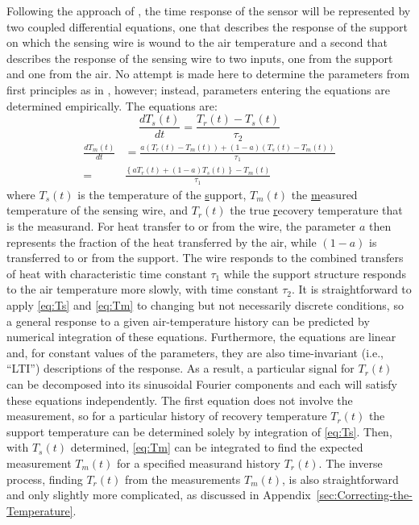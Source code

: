 \documentclass[11pt,twoside,american,12pt,twoside,american]{article}\usepackage[]{graphicx}\usepackage[]{color}
\begin{document}
Following the approach of \citet{PayneEtAl1994}, the time response
of the sensor will be represented by two coupled differential equations,
one that describes the response of the support on which the sensing
wire is wound to the air temperature and a second that describes the
response of the sensing wire to two inputs, one from the support and
one from the air. No attempt is made here to determine the parameters
from first principles as in \citet{PayneEtAl1994}, however; instead,
parameters entering the equations are determined empirically. The
equations are:\\
\begin{equation}
\frac{dT_{s}(t)}{dt}=\frac{T_{r}(t)-T_{s}(t)}{\tau_{2}}\label{eq:Ts}
\end{equation}
\begin{align}
\frac{dT_{m}(t)}{dt} & =\frac{a(T_{r}(t)-T_{m}(t))+(1-a)(T_{s}(t)-T_{m}(t))}{\tau_{1}}\label{eq:Tm}\\
= & \frac{\left\{ aT_{r}(t)+(1-a)T_{s}(t)\right\} -T_{m}(t)}{\tau_{1}}\nonumber 
\end{align}
where $T_{s}(t)$ is the temperature of the \uline{s}upport, $T_{m}(t)$
the \uline{m}easured temperature of the sensing wire, and $T_{r}(t)$
the true \uline{r}ecovery temperature that is the measurand. For
heat transfer to or from the wire, the parameter $a$ then represents
the fraction of the heat transferred by the air, while $(1-a)$ is
transferred to or from the support. The wire responds to the combined
transfers of heat with characteristic time constant $\tau_{1}$ while
the support structure responds to the air temperature more slowly,
with time constant $\tau_{2}$. It is straightforward to apply \eqref{eq:Ts}
and \eqref{eq:Tm} to changing but not necessarily discrete conditions,
so a general response to a given air-temperature history can be predicted
by numerical integration of these equations. Furthermore, the equations
are linear and, for constant values of the parameters, they are also
time-invariant (i.e., ``LTI'') descriptions of the response. As
a result, a particular signal for $T_{r}(t)$ can be decomposed into
its sinusoidal Fourier components and each will satisfy these equations
independently. The first equation does not involve the measurement,
so for a particular history of recovery temperature $T_{r}(t)$ the
support temperature can be determined solely by integration of \eqref{eq:Ts}.
Then, with $T_{s}(t)$ determined, \eqref{eq:Tm} can be integrated
to find the expected measurement $T_{m}(t)$ for a specified measurand
history $T_{r}(t)$. The inverse process, finding $T_{r}(t)$ from
the measurements $T_{m}(t)$, is also straightforward and only slightly
more complicated, as discussed in Appendix~\ref{sec:Correcting-the-Temperature}.
\end{document}
